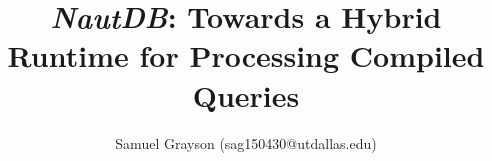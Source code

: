 \documentclass[final]{beamer}
\title{\emph{NautDB}: Towards a Hybrid Runtime for Processing Compiled Queries}
\author{Samuel Grayson (sag150430@utdallas.edu)}
\institute{University of Texas at Dallas}
\newlength{\sepwid}
\newlength{\onecolwid}
\begin{document}
\begin{frame}[t] %

  \begin{columns}[t]

    \begin{column}{\sepwid}
    \end{column}

    \begin{column}{\onecolwid}
      
      
    \end{column}

    \begin{column}{\sepwid}
    \end{column}

    \begin{column}{\onecolwid}
      \begin{figure}

\end{figure}
\end{column}
\end{columns}
\end{frame}
\end{document}
